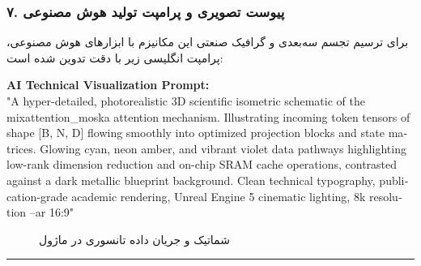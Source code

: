 \subsubsection*{۷. پیوست تصویری و پرامپت تولید هوش مصنوعی}
برای ترسیم تجسم سه‌بعدی و گرافیک صنعتی این مکانیزم با ابزارهای هوش مصنوعی، پرامپت انگلیسی زیر با دقت تدوین شده است:

\vspace{0.2cm}
\begin{latin}
\footnotesize
\textbf{AI Technical Visualization Prompt:}\\
"A hyper-detailed, photorealistic 3D scientific isometric schematic of the mixattention\_moska attention mechanism. Illustrating incoming token tensors of shape [B, N, D] flowing smoothly into optimized projection blocks and state matrices. Glowing cyan, neon amber, and vibrant violet data pathways highlighting low-rank dimension reduction and on-chip SRAM cache operations, contrasted against a dark metallic blueprint background. Clean technical typography, publication-grade academic rendering, Unreal Engine 5 cinematic lighting, 8k resolution --ar 16:9"
\end{latin}

\begin{figure}[H]
    \centering
    \caption{شماتیک و جریان داده تانسوری در ماژول }
    \label{fig:mixattention_moska}
\end{figure}

\vspace{0.5cm}
\hrule
\vspace{0.5cm}
